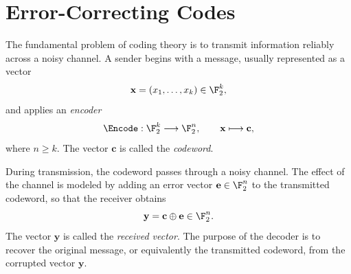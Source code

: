 \section{Error-Correcting Codes}

The fundamental problem of coding theory is to transmit information reliably across a noisy channel. 
A sender begins with a message, usually represented as a vector
\[
\mathbf{x}=(x_1,\dots,x_k)\in \F_2^k,
\]
and applies an \emph{encoder}
\[
\Encode:\F_2^k \longrightarrow \F_2^n,
\qquad
\mathbf{x}\longmapsto \mathbf{c},
\]
where \(n\ge k\). 
The vector \(\mathbf{c}\) is called the \emph{codeword}. 

During transmission, the codeword passes through a noisy channel. 
The effect of the channel is modeled by adding an error vector $
\mathbf{e}\in \F_2^n$
to the transmitted codeword, so that the receiver obtains
\[
\mathbf{y}=\mathbf{c}\oplus\mathbf{e}\in\F_2^n.
\]
The vector \(\mathbf{y}\) is called the \emph{received vector}. 
The purpose of the decoder is to recover the original message, or equivalently the transmitted codeword, from the corrupted vector \(\mathbf{y}\).

